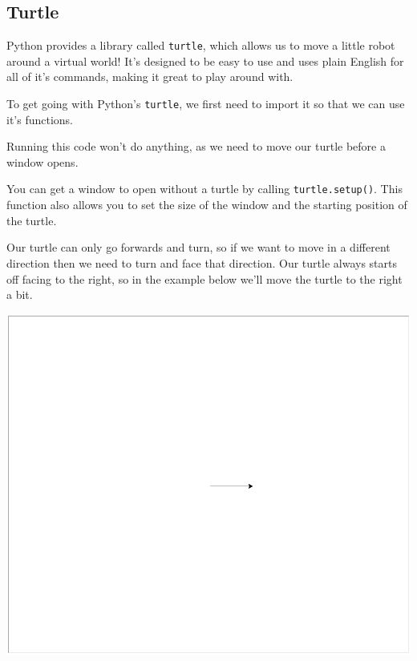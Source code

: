 	\subsection{Turtle}

		Python provides a library called \texttt{turtle}, which allows us to move a little robot around a virtual world! It's designed to be easy to use and uses plain English for all of it's commands, making it great to play around with.

		To get going with Python's \texttt{turtle}, we first need to import it so that we can use it's functions.

		

		Running this code won't do anything, as we need to move our turtle before a window opens.

		\begin{aside}
			You can get a window to open without a turtle by calling \texttt{turtle.setup()}. This function also allows you to set the size of the window and the starting position of the turtle.
		\end{aside}

		Our turtle can only go forwards and turn, so if we want to move in a different direction then we need to turn and face that direction. Our turtle always starts off facing to the right, so in the example below we'll move the turtle to the right a bit.

		

		\begin{center}
			\includegraphics[width=0.75\linewidth]{McrRaspJam/014_Python/3_exercises/turtle/move}
		\end{center}

